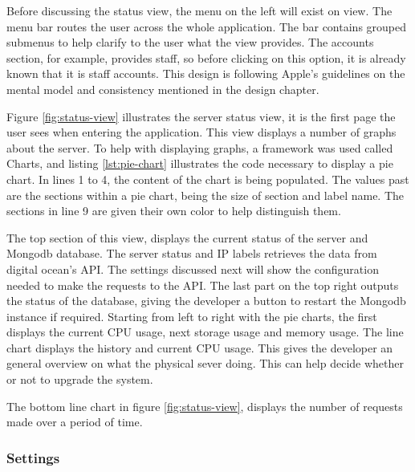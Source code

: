 Before discussing the status view, the menu on the left will exist on view. The menu bar routes the user across the whole application. The bar contains grouped submenus to help clarify to the user what the view provides. The accounts section, for example, provides staff, so before clicking on this option, it is already known that it is staff accounts. This design is following Apple's guidelines on the mental model and consistency mentioned in the design chapter.

Figure \ref{fig:status-view} illustrates the server status view, it is the first page the user sees when entering the application. This view displays a number of graphs about the server. To help with displaying graphs, a framework was used called Charts, and listing \ref{lst:pie-chart} illustrates the code necessary to display a pie chart. In lines 1 to 4, the content of the chart is being populated. The values past are the sections within a pie chart, being the size of section and label name. The sections in line 9 are given their own color to help distinguish them.

The top section of this view, displays the current status of the server and Mongodb database. The server status and IP labels retrieves the data from digital ocean's API. The settings discussed next will show the configuration needed to make the requests to the API. The last part on the top right outputs the status of the database, giving the developer a button to restart the Mongodb instance if required. Starting from left to right with the pie charts, the first displays the current CPU usage, next storage usage and memory usage. The line chart displays the history and current CPU usage. This gives the developer an general overview on what the physical sever doing. This can help decide whether or not to upgrade the system.




The bottom line chart in figure \ref{fig:status-view}, displays the number of requests made over a period of time.

\subsubsection{Settings}

